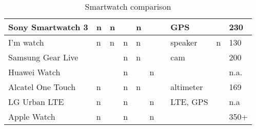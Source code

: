 \begin{table}[h]
\begin{tabular}{|l|l|l|l|l|l|l|l|l|l|}
\cellcolor[HTML]{F8FF00}Sony Smartwatch 3 & \cellcolor[HTML]{FE0000}n & \cellcolor[HTML]{FE0000}n & \cellcolor[HTML]{32CB00}  & \cellcolor[HTML]{FE0000}n & \cellcolor[HTML]{32CB00}  & \cellcolor[HTML]{32CB00} & GPS                 & \cellcolor[HTML]{32CB00}  & 230                         \\ \hline
I’m watch                                 & \cellcolor[HTML]{FE0000}n & \cellcolor[HTML]{FE0000}n & \cellcolor[HTML]{FE0000}n & \cellcolor[HTML]{FE0000}n & \cellcolor[HTML]{32CB00}  & \cellcolor[HTML]{32CB00} & speaker             & \cellcolor[HTML]{FE0000}n & 130                         \\ \hline
Samsung Gear Live                         & \cellcolor[HTML]{32CB00}  & \cellcolor[HTML]{32CB00}  & \cellcolor[HTML]{FE0000}n & \cellcolor[HTML]{FE0000}n & \cellcolor[HTML]{32CB00}  & \cellcolor[HTML]{32CB00} & cam                 & \cellcolor[HTML]{32CB00}  & 200                         \\ \hline
Huawei Watch                              & \cellcolor[HTML]{32CB00}  & \cellcolor[HTML]{32CB00}  & \cellcolor[HTML]{FE0000}n & \cellcolor[HTML]{32CB00}  & \cellcolor[HTML]{FE0000}n & \cellcolor[HTML]{32CB00} &                     & \cellcolor[HTML]{32CB00}  & n.a.                        \\ \hline
Alcatel One Touch                         & \cellcolor[HTML]{FE0000}n & \cellcolor[HTML]{32CB00}  & \cellcolor[HTML]{FE0000}n & \cellcolor[HTML]{FE0000}n & \cellcolor[HTML]{32CB00}  & \cellcolor[HTML]{32CB00} & altimeter           & \cellcolor[HTML]{32CB00}  & 169                         \\ \hline
LG Urban LTE                              & \cellcolor[HTML]{FE0000}n & \cellcolor[HTML]{32CB00}  & \cellcolor[HTML]{FE0000}n & \cellcolor[HTML]{32CB00}  & \cellcolor[HTML]{FE0000}n & \cellcolor[HTML]{32CB00} & LTE, GPS            & \cellcolor[HTML]{32CB00}  & \cellcolor[HTML]{FFFFFF}n.a \\ \hline
\cellcolor[HTML]{FCFF2F}Apple Watch       & \cellcolor[HTML]{FE0000}n & \cellcolor[HTML]{32CB00}  & \cellcolor[HTML]{FE0000}n & \cellcolor[HTML]{32CB00}  & \cellcolor[HTML]{FE0000}n & \cellcolor[HTML]{32CB00} &                     & \cellcolor[HTML]{32CB00}  & 350+                        \\ \hline
\end{tabular}
\caption{ Smartwatch comparison }
\end{table}
\pagebreak
